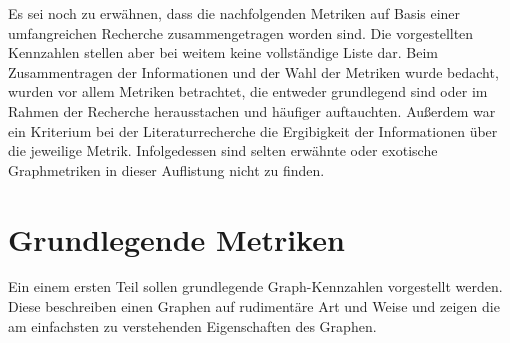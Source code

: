 \documentclass[a4paper,12pt,ngerman,chapterprefix=false,listof=totoc,bibliography=totoc]{scrreprt}
\begin{document}
{Es sei noch zu erwähnen, dass die nachfolgenden Metriken auf Basis einer umfangreichen Recherche zusammengetragen worden sind. Die vorgestellten Kennzahlen stellen aber bei weitem keine vollständige Liste dar. Beim Zusammentragen der Informationen und der Wahl der Metriken wurde bedacht, wurden vor allem Metriken betrachtet, die entweder grundlegend sind oder im Rahmen der Recherche herausstachen und häufiger auftauchten. Außerdem war ein Kriterium bei der Literaturrecherche die Ergibigkeit der Informationen über die jeweilige Metrik. Infolgedessen sind selten erwähnte oder exotische Graphmetriken in dieser Auflistung nicht zu finden.
}
\section{Grundlegende Metriken}
{
Ein einem ersten Teil sollen grundlegende Graph-Kennzahlen vorgestellt werden. Diese beschreiben einen Graphen auf rudimentäre Art und Weise und zeigen die am einfachsten zu verstehenden Eigenschaften des Graphen.
}
\end{document}
